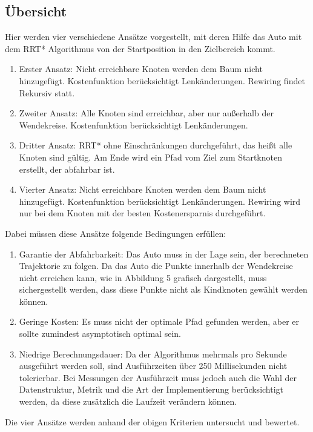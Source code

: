 \subsection{Übersicht}
\label{sec:uebersicht}
Hier werden vier verschiedene Ansätze vorgestellt, mit deren Hilfe das Auto mit dem RRT* Algorithmus von der Startposition in den Zielbereich kommt.
\begin{enumerate}
\item Erster Ansatz: Nicht erreichbare Knoten werden dem Baum nicht hinzugefügt. Kostenfunktion berücksichtigt Lenkänderungen. Rewiring findet Rekursiv statt.
\item Zweiter Ansatz: Alle Knoten sind erreichbar, aber nur außerhalb der Wendekreise. Kostenfunktion berücksichtigt Lenkänderungen.
\item Dritter Ansatz: RRT* ohne Einschränkungen durchgeführt, das heißt alle Knoten sind gültig. Am Ende wird ein Pfad vom Ziel zum Startknoten erstellt, der abfahrbar ist.
\item Vierter Ansatz: Nicht erreichbare Knoten werden dem Baum nicht hinzugefügt. Kostenfunktion berücksichtigt Lenkänderungen. Rewiring wird nur bei dem Knoten mit der besten Kostenersparnis durchgeführt.
\end{enumerate}
Dabei müssen diese Ansätze folgende Bedingungen erfüllen: \\
\begin{enumerate}
\item Garantie der Abfahrbarkeit: Das Auto muss in der Lage sein, der berechneten Trajektorie zu folgen. Da das Auto die Punkte innerhalb der Wendekreise nicht erreichen kann, wie in Abbildung 5 grafisch dargestellt, muss sichergestellt werden, dass diese Punkte nicht als Kindknoten gewählt werden können.
\item Geringe Kosten: Es muss nicht der optimale Pfad gefunden werden, aber er sollte zumindest asymptotisch optimal sein. 
\item Niedrige Berechnungsdauer: Da der Algorithmus mehrmals pro Sekunde ausgeführt werden soll, sind Ausführzeiten über 250 Millisekunden nicht tolerierbar. Bei Messungen der Ausführzeit muss jedoch auch die Wahl der Datenstruktur, Metrik und die Art der Implementierung berücksichtigt werden, da diese zusätzlich die Laufzeit verändern können.
\end{enumerate}
Die vier Ansätze werden anhand der obigen Kriterien untersucht und bewertet.
